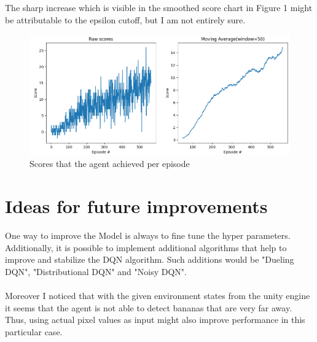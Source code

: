 \documentclass[12pt,a4paper]{article}
\begin{document}
    \noindent The sharp increase which is visible in the smoothed score chart in Figure 1 might be attributable to the epsilon cutoff, but I am not entirely sure.

    \begin{figure}[H]
        \includegraphics[width=\linewidth]{assets/run-2021-05-06-14-06}
        \caption{Scores that the agent achieved per episode}
        \label{fig:scores}
    \end{figure}


    \section{Ideas for future improvements}\label{sec:ideas}
    One way to improve the Model is always to fine tune the hyper parameters.
    Additionally, it is possible to implement additional algorithms that help to improve and stabilize the DQN algorithm.
    Such additions would be "Dueling DQN", "Distributional DQN" and "Noisy DQN".
    \\\\
    Moreover I noticed that with the given environment states from the unity engine it seems that the agent is not able
    to detect bananas that are very far away.
    Thus, using actual pixel values as input might also improve performance in this particular case.
\end{document}
